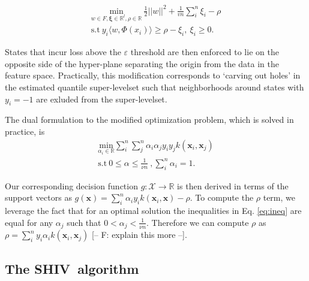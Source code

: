 \documentclass[10pt, conference]{ieeeconf}      %
\newcommand{\bx}{\mathbf{x}}
\newcommand{\acro}{SHIV}
\begin{document}
\vspace{-2ex}
\begin{align}\label{eq:primal_sup}
    \underset{w\in F, \mathbf{\xi} \in \mathbb{R}^l, \rho \in \mathbb{R}}{\mbox{min}}\: \frac{1}{2}||w||^2+\frac{1}{vn} \sum^n_i \xi_i - \rho\\
\mbox{s.t} \: y_i \langle w,\Phi(x_i)\rangle \geq \rho - \xi_i, \: \xi_i \geq 0 \label{eq:ineq}.
\end{align}

States that incur loss above the $\varepsilon$ threshold are then enforced to lie on the opposite side of the
hyper-plane separating the origin from the data in the feature space. Practically, this modification corresponds to
`carving out holes' in the estimated quantile super-levelset such that neighborhoods around states with $y_i=-1$ are
exluded from the super-levelset.

The dual formulation to the modified optimization problem, which is solved in practice, is 
\vspace{-2ex}
\begin{align}\label{eq:dual_sup}
\underset{\alpha_i\in \mathbb{R}}{\mbox{min}} \sum_i^n \sum_j^n \alpha_i\alpha_j y_i y_jk(\bx_i,\bx_j)\\
\mbox{s.t} \: 0 \leq \alpha \leq \frac{1}{\nu n} \:, \sum_i^n \alpha_i = 1.
\end{align}

Our corresponding decision function $g:\mathcal{X}\to \mathbb{R}$ is then derived in terms of the support vectors as $g(\bx) = \sum_i^n
\alpha_i y_i k(\bx_i,\bx) - \rho$. To compute the $\rho$ term, we leverage the fact that for an optimal solution the
inequalities in Eq. \ref{eq:ineq} are equal for any $\alpha_j$ such that $0 < \alpha_j < \frac{1}{\nu n}$. Therefore we
can compute $\rho$ as  $\rho = \sum_i^n y_i \alpha_i k(\bx_i,\bx_j)$ \cite{scholkopf2001estimating} {\color{blue} [-- F:
explain this more --]}.




\subsection{The \acro~algorithm}
\end{document}
